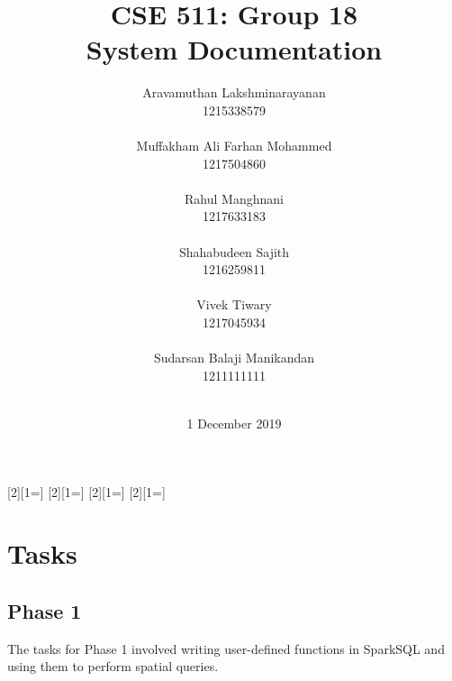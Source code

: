 \usepackage[colorinlistoftodos,prependcaption,textsize=footnotesize]{todonotes}
[2][1=]{\textcolor{Red}
{}}
[2][1=]{\textcolor{Blue}
{}}
[2][1=]{\textcolor{OliveGreen}{}}
[2][1=]{\textcolor{Plum}{}}





\title{
{\Huge CSE 511: Group 18{\large\linebreak\\} System Documentation{\large\linebreak\\}}
}
\author{
Aravamuthan Lakshminarayanan\\
1215338579\\\\
Muffakham Ali Farhan Mohammed\\
1217504860\\\\
Rahul Manghnani\\
1217633183\\\\
Shahabudeen Sajith\\
1216259811\\\\
Vivek Tiwary\\
1217045934\\\\
Sudarsan Balaji Manikandan\\
1211111111\\\\
}
\date{1 December 2019}
\maketitle
\newpage


\tableofcontents\label{c}
\newpage

\section{Tasks} \label{Tasks}
	\subsection{Phase 1} \label{Phase 1}
    The tasks for Phase 1 involved writing user-defined functions in SparkSQL and using them to perform spatial queries.\\

